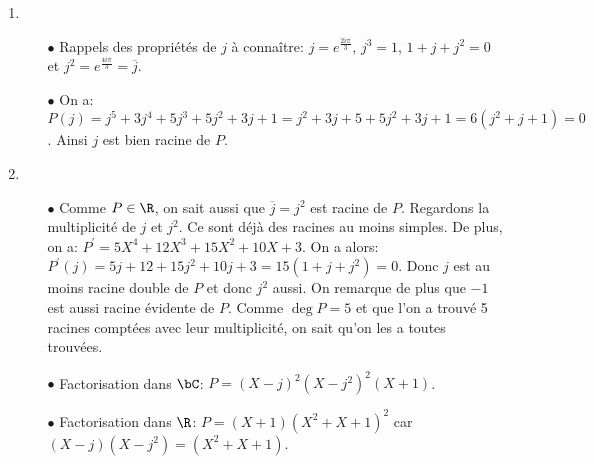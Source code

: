 \documentclass[a4paper, 11pt,reqno]{article}
\begin{document}
\begin{correction}  \;
	\begin{enumerate}
		\item
		      \begin{itemize}
			      \item[$\bullet$] Rappels des propri\'et\'es de $j$ \`{a} conna\^{i}tre: $j=e^{\frac{2i\pi}{3}}$, $j^3=1$, $1+j+j^2=0$ et $j^2=e^{\frac{4i\pi}{3}}=\overline{j}$.
			      \item[$\bullet$] On a: $P(j)=j^5+3j^4+5j^3+5j^2+3j+1=j^2+3j+5+5j^2+3j+1=6(j^2+j+1)=0$. Ainsi $j$ est bien racine de $P$.
		      \end{itemize}
		\item
		      \begin{itemize}
			      \item[$\bullet$]
			            Comme $P\in\R$, on sait aussi que $\overline{j}=j^2$ est racine de $P$. Regardons la multiplicit\'e de $j$ et $j^2$. Ce sont d\'ej\`{a} des racines au moins simples. De plus, on a: $P^{\prime}=5X^4+12X^3+15X^2+10X+3$. On a alors: $P^{\prime}(j)=5j+12+15j^2+10j+3=15(1+j+j^2)=0$. Donc $j$ est au moins racine double de $P$ et donc $j^2$ aussi.
			            On remarque de plus que $-1$ est aussi racine \'evidente de $P$. Comme $\deg{P}=5$ et que l'on a trouv\'e 5 racines compt\'ees avec leur multiplicit\'e, on sait qu'on les a toutes trouv\'ees.
			      \item[$\bullet$] Factorisation dans $\bC$: $P=(X-j)^2(X-j^2)^2(X+1)$.
			      \item[$\bullet$] Factorisation dans $\R$: $P=(X+1)(X^2+X+1)^2$ car $(X-j)(X-j^2)=(X^2+X+1)$.
		      \end{itemize}
	\end{enumerate}
\end{correction}
\end{document}
